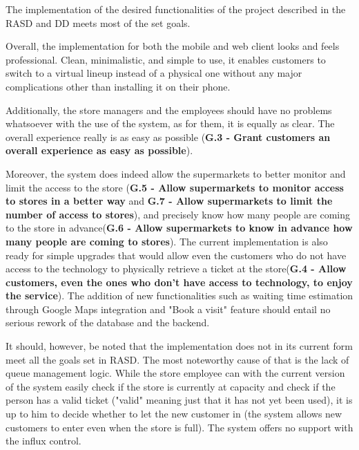 \hspace{\parindent}The implementation of the desired functionalities of the project described in the RASD and DD meets most of the set goals. \newline

Overall, the implementation for both the mobile and web client looks and feels professional. Clean, minimalistic, and simple to use, it enables customers to switch to a virtual lineup instead of a physical one without any major complications other than installing it on their phone. \newline 

Additionally, the store managers and the employees should have no problems whatsoever with the use of the system, as for them, it is equally as clear. The overall experience really is as easy as possible (\textbf{G.3 - Grant customers an overall experience as easy as possible}).\newline

Moreover, the system does indeed allow the supermarkets to better monitor and limit the access to the store (\textbf{G.5 - Allow supermarkets to monitor access to stores in a better way} and \textbf{G.7 - Allow supermarkets to limit the number of access to stores}), and precisely know how many people are coming to the store in advance(\textbf{G.6 - Allow supermarkets to know in advance how many people are coming to stores}). The current implementation is also ready for simple upgrades that would allow even the customers who do not have access to the technology to physically retrieve a ticket at the store(\textbf{G.4 - Allow  customers,  even  the  ones  who  don’t  have  access  to  technology,  to  enjoy  the service}). The addition of new functionalities such as waiting time estimation through Google Maps integration and "Book a visit" feature should entail no serious rework of the database and the backend.\newline


It should, however, be noted that the implementation does not in its current form meet all the goals set in RASD. The most noteworthy cause of that is the lack of queue management logic. While the store employee can with the current version of the system easily check if the store is currently at capacity and check if the person has a valid ticket ("valid" meaning just that it has not yet been used), it is up to him to decide whether to let the new customer in (the system allows new customers to enter even when the store is full). The system offers no support with the influx control.\newline

